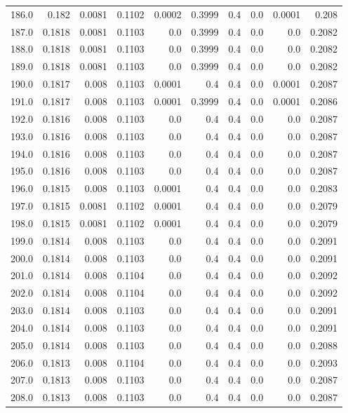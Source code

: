 \begin{longtable}{lrrrrrrrrr}
186.0 & 0.182 & 0.0081 & 0.1102 & 0.0002 & 0.3999 & 0.4 & 0.0 & 0.0001 & 0.208 \\
187.0 & 0.1818 & 0.0081 & 0.1103 & 0.0 & 0.3999 & 0.4 & 0.0 & 0.0 & 0.2082 \\
188.0 & 0.1818 & 0.0081 & 0.1103 & 0.0 & 0.3999 & 0.4 & 0.0 & 0.0 & 0.2082 \\
189.0 & 0.1818 & 0.0081 & 0.1103 & 0.0 & 0.3999 & 0.4 & 0.0 & 0.0 & 0.2082 \\
190.0 & 0.1817 & 0.008 & 0.1103 & 0.0001 & 0.4 & 0.4 & 0.0 & 0.0001 & 0.2087 \\
191.0 & 0.1817 & 0.008 & 0.1103 & 0.0001 & 0.3999 & 0.4 & 0.0 & 0.0001 & 0.2086 \\
192.0 & 0.1816 & 0.008 & 0.1103 & 0.0 & 0.4 & 0.4 & 0.0 & 0.0 & 0.2087 \\
193.0 & 0.1816 & 0.008 & 0.1103 & 0.0 & 0.4 & 0.4 & 0.0 & 0.0 & 0.2087 \\
194.0 & 0.1816 & 0.008 & 0.1103 & 0.0 & 0.4 & 0.4 & 0.0 & 0.0 & 0.2087 \\
195.0 & 0.1816 & 0.008 & 0.1103 & 0.0 & 0.4 & 0.4 & 0.0 & 0.0 & 0.2087 \\
196.0 & 0.1815 & 0.008 & 0.1103 & 0.0001 & 0.4 & 0.4 & 0.0 & 0.0 & 0.2083 \\
197.0 & 0.1815 & 0.0081 & 0.1102 & 0.0001 & 0.4 & 0.4 & 0.0 & 0.0 & 0.2079 \\
198.0 & 0.1815 & 0.0081 & 0.1102 & 0.0001 & 0.4 & 0.4 & 0.0 & 0.0 & 0.2079 \\
199.0 & 0.1814 & 0.008 & 0.1103 & 0.0 & 0.4 & 0.4 & 0.0 & 0.0 & 0.2091 \\
200.0 & 0.1814 & 0.008 & 0.1103 & 0.0 & 0.4 & 0.4 & 0.0 & 0.0 & 0.2091 \\
201.0 & 0.1814 & 0.008 & 0.1104 & 0.0 & 0.4 & 0.4 & 0.0 & 0.0 & 0.2092 \\
202.0 & 0.1814 & 0.008 & 0.1104 & 0.0 & 0.4 & 0.4 & 0.0 & 0.0 & 0.2092 \\
203.0 & 0.1814 & 0.008 & 0.1103 & 0.0 & 0.4 & 0.4 & 0.0 & 0.0 & 0.2091 \\
204.0 & 0.1814 & 0.008 & 0.1103 & 0.0 & 0.4 & 0.4 & 0.0 & 0.0 & 0.2091 \\
205.0 & 0.1814 & 0.008 & 0.1103 & 0.0 & 0.4 & 0.4 & 0.0 & 0.0 & 0.2088 \\
206.0 & 0.1813 & 0.008 & 0.1104 & 0.0 & 0.4 & 0.4 & 0.0 & 0.0 & 0.2093 \\
207.0 & 0.1813 & 0.008 & 0.1103 & 0.0 & 0.4 & 0.4 & 0.0 & 0.0 & 0.2087 \\
208.0 & 0.1813 & 0.008 & 0.1103 & 0.0 & 0.4 & 0.4 & 0.0 & 0.0 & 0.2087 \\

\end{longtable}
